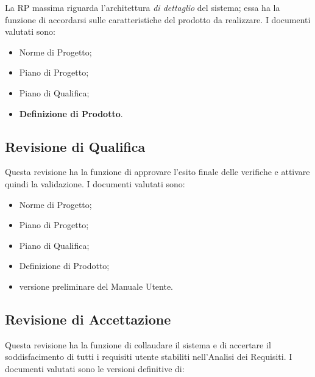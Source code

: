 \documentclass[a4paper]{article}
\begin{document}
		
La RP massima riguarda l'architettura \emph{di dettaglio} del sistema; essa ha la funzione di accordarsi sulle caratteristiche del prodotto da realizzare. I documenti valutati sono:
		
	\begin{itemize}
		
			
	\item Norme di Progetto;
			
	\item Piano di Progetto;
			
	\item Piano di Qualifica;
			
	\item \textbf{Definizione di Prodotto}.
		
	\end{itemize}


		
	\subsection{Revisione di Qualifica}

		
Questa revisione ha la funzione di approvare l'esito finale delle verifiche e attivare quindi la validazione. I documenti valutati sono:
		
	\begin{itemize}
		
			
	\item Norme di Progetto;
			
	\item Piano di Progetto;
			
	\item Piano di Qualifica;
			
	\item Definizione di Prodotto;
			
	\item versione preliminare del Manuale Utente.
		
	\end{itemize}


		
	\subsection{Revisione di Accettazione}

		
Questa revisione ha la funzione di collaudare il sistema e di accertare il soddisfacimento di tutti i requisiti utente stabiliti nell'Analisi dei Requisiti. I documenti valutati sono le versioni definitive di:
		
\end{document}
